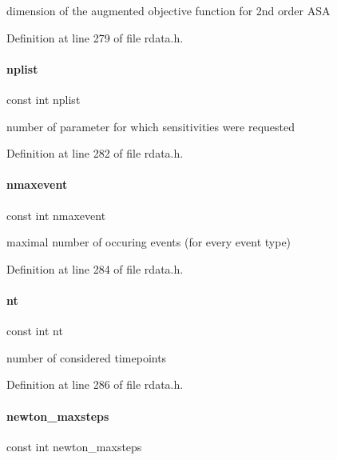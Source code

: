 dimension of the augmented objective function for 2nd order A\+SA 

Definition at line 279 of file rdata.\+h.

\mbox{\label{classamici_1_1_return_data_a2375af1667e955ed7a61ade0868f735a}} 
\paragraph{\texorpdfstring{nplist}{nplist}}
{\footnotesize\ttfamily const int nplist}

number of parameter for which sensitivities were requested 

Definition at line 282 of file rdata.\+h.

\mbox{\label{classamici_1_1_return_data_a48832d4f3a37c4fd75cc7f4ef578d1b1}} 
\paragraph{\texorpdfstring{nmaxevent}{nmaxevent}}
{\footnotesize\ttfamily const int nmaxevent}

maximal number of occuring events (for every event type) 

Definition at line 284 of file rdata.\+h.

\mbox{\label{classamici_1_1_return_data_a21dcbe77c07eeefce79fcacdbe5f1262}} 
\paragraph{\texorpdfstring{nt}{nt}}
{\footnotesize\ttfamily const int nt}

number of considered timepoints 

Definition at line 286 of file rdata.\+h.

\mbox{\label{classamici_1_1_return_data_a871e64bbfbd5881a86f21aaff42c3dec}} 
\paragraph{\texorpdfstring{newton\_maxsteps}{newton\_maxsteps}}
{\footnotesize\ttfamily const int newton\+\_\+maxsteps}

